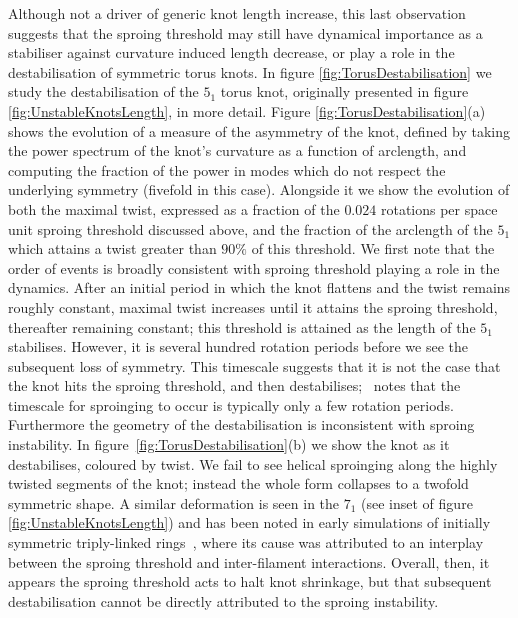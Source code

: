 Although not a driver of generic knot length increase, this last observation suggests that the sproing threshold may still have dynamical importance as a stabiliser against curvature induced length decrease, or play a role in the destabilisation of symmetric torus knots. In figure \ref{fig:TorusDestabilisation} we study the destabilisation of the $5_1$ torus knot, originally presented in figure \ref{fig:UnstableKnotsLength}, in more detail. Figure \ref{fig:TorusDestabilisation}(a) shows the evolution of a measure of the asymmetry of the knot, defined by taking the power spectrum of the knot's curvature as a function of arclength, and computing the fraction of the power in modes which do not respect the underlying symmetry (fivefold in this case). Alongside it we show the evolution of both the maximal twist, expressed as a fraction of the $0.024$ rotations per space unit sproing threshold discussed above, and the fraction of the arclength of the $5_1$ which attains a twist greater than $90\%$ of this threshold. We first note that the order of events is broadly consistent with sproing threshold playing a role in the dynamics. After an initial period in which the knot flattens and the twist remains roughly constant, maximal twist increases until it attains the sproing threshold, thereafter remaining constant; this threshold is attained as the length of the $5_1$ stabilises. However, it is several hundred rotation periods before we see the subsequent loss of symmetry. This timescale suggests that it is not the case that the knot hits the sproing threshold, and then destabilises;~\citep{Henze1993} notes that the timescale for sproinging to occur is typically only a few rotation periods. Furthermore the geometry of the destabilisation is inconsistent with sproing instability. In figure~\ref{fig:TorusDestabilisation}(b) we show the knot as it destabilises, coloured by twist. We fail to see helical sproinging along the highly twisted segments of the knot; instead the whole form collapses to a twofold symmetric shape. A similar deformation is seen in the $7_1$ (see inset of figure \ref{fig:UnstableKnotsLength}) and has been noted in early simulations of initially symmetric triply-linked rings~\citep{Henze1993}, where its cause was attributed to an interplay between the sproing threshold and inter-filament interactions. Overall, then, it appears the sproing threshold acts to halt knot shrinkage, but that subsequent destabilisation cannot be directly attributed to the sproing instability. 

